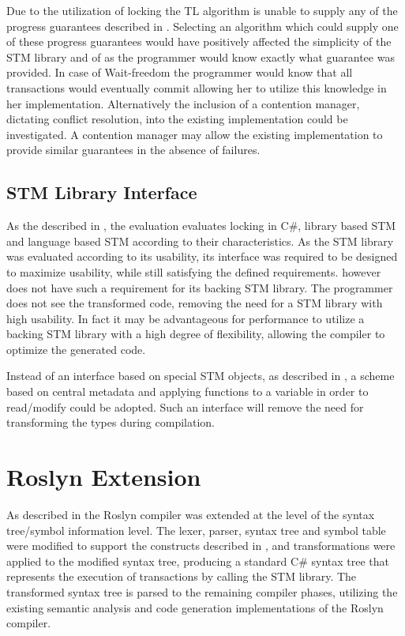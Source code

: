Due to the utilization of locking the TL algorithm is unable to supply any of the progress guarantees described in . Selecting an algorithm which could supply one of these progress guarantees would have positively affected the simplicity of the \ac{STM} library and of \stmname as the programmer would know exactly what guarantee was provided. In case of Wait-freedom the programmer would know that all transactions would eventually commit allowing her to utilize this knowledge in her implementation. Alternatively the inclusion of a contention manager, dictating conflict resolution, into the existing implementation could be investigated. A contention manager may allow the existing implementation to provide similar guarantees in the absence of failures.

\subsection{STM Library Interface}
As the described in , the evaluation evaluates locking in C\#, library based \ac{STM} and language based \ac{STM} according to their characteristics. As the \ac{STM} library was evaluated according to its usability, its interface was required to be designed to maximize usability, while still satisfying the defined requirements. \stmname however does not have such a requirement for its backing \ac{STM} library. The programmer does not see the transformed code, removing the need for a \ac{STM} library with high usability. In fact it may be advantageous for performance to utilize a backing \ac{STM} library with a high degree of flexibility, allowing the compiler to optimize the generated code. 

Instead of an interface based on special \ac{STM} objects, as described in , a scheme based on central metadata and applying functions to a variable in order to read/modify could be adopted. Such an interface will remove the need for transforming the types during compilation.

\section{Roslyn Extension}\label{sec:reflection_roslyn_extension}
As described in  the Roslyn compiler was extended at the level of the syntax tree/symbol information level. The lexer, parser, syntax tree and symbol table were modified to support the constructs described in , and transformations were applied to the modified syntax tree, producing a standard C\# syntax tree that represents the execution of transactions by calling the \ac{STM} library. The transformed syntax tree is parsed to the remaining compiler phases, utilizing the existing semantic analysis and code generation implementations of the Roslyn compiler. 


